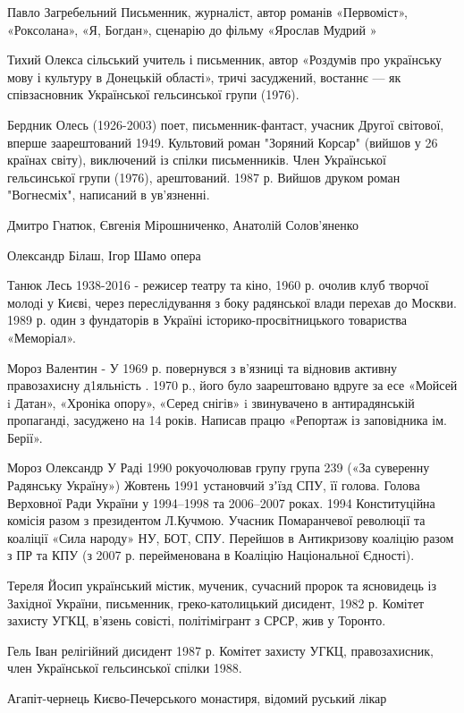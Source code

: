 Павло Загребельний Письменник, журналіст, автор романів «Первоміст», «Роксолана», «Я, Бог­дан», сценарію до фільму «Ярослав Мудрий »

Тихий Олекса сільський учитель і письменник, автор «Роздумів про українську мову і культуру в Донецькій області», тричі засуджений, востаннє — як співзасновник Української гельсинської групи (1976).

Бердник Олесь (1926-2003) поет, письменник-фантаст, учасник Другої світової, вперше заарештований 1949. Культовий роман "Зоряний Корсар" (вийшов у 26 країнах світу), виключений із спілки письменників. Член Української гельсинської групи (1976), арештований. 1987 р. Вийшов друком роман "Вогнесміх", написаний в ув'язненні.

Дмитро Гнатюк, Євгенія Мірошниченко, Анатолій Солов'яненко

Олександр Білаш, Ігор Шамо опера

Танюк Лесь 1938-2016 - режисер театру та кіно, 1960 р. очолив клуб творчої молоді у Києві, через переслідування з боку радянської влади перехав до Москви. 1989 р. один з фундаторів в Україні історико-просвітницького товариства «Меморіал».

Мороз Валентин - У 1969 р. повернувся з в’язниці та відновив активну правозахисну д1яльність . 1970 р., його було заарештовано вдруге за есе «Мойсей i Датан», «Хроніка опору», «Серед снігів» i звинувачено в антирадянській пропаганді, засуджено на 14 років. Написав працю «Репортаж із заповідника ім. Берії».

Мороз Олександр  У Раді 1990 рокуочолював групу група 239 («За суверенну Радянську Україну») Жовтень 1991 установчий зʼїзд СПУ, її голова.  Голова Верховної Ради України у 1994–1998 та 2006–2007 роках. 1994 Конституційна комісія  разом з президентом Л.Кучмою. Учасник Помаранчевої революції та коаліції «Сила народу» НУ, БОТ, СПУ. Перейшов в Антикризову коаліцію разом з ПР та КПУ (з 2007 р. перейменована в Коаліцію Національної Єдності).  

Тереля Йосип український містик, мученик, сучасний пророк та ясновидець із Західної України, письменник, греко-католицький дисидент, 1982 р. Комітет захисту УГКЦ, в'язень совісті, політімігрант з СРСР, жив у Торонто.

Гель Іван релігійний дисидент 1987 р. Комітет захисту УГКЦ, правозахисник, член Української гельсинської спілки 1988.




Агапіт-чернець Києво-Печерського монастиря, відомий руський лікар

